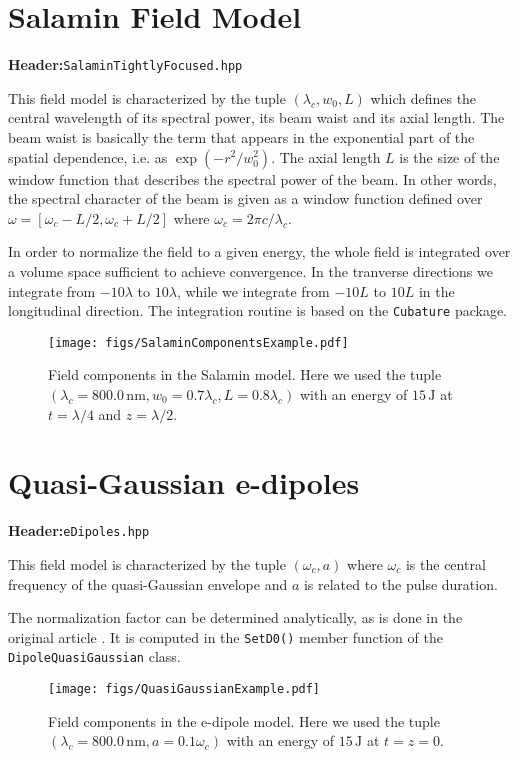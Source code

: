 \documentclass[10pt,letterpaper,extrafontsizes, onecolumn,openright]{memoir}
\begin{document}
\section{Salamin Field Model}
\textbf{Header:}\hfill\texttt{SalaminTightlyFocused.hpp}
\vspace{0.5cm}

This field model is characterized by the tuple $(\lambda_c,w_0,L)$ which
defines the central wavelength of its spectral power, its beam waist and
its axial length. The beam waist is basically the term that appears in the exponential
part of the spatial dependence, i.e. as $\exp(-r^2/w_0^2)$. The axial length $L$
is the size of the window function that describes the spectral power of the beam.
In other words, the spectral character of the beam is given as a window function
defined over $\omega=[\omega_c-L/2,­\omega_c+L/2]$ where $\omega_c=2\pi c/\lambda_c$.

In order to normalize the field to a given energy, the whole field is integrated
over a volume space sufficient to achieve convergence. In the tranverse
directions we integrate from $-10\lambda$ to $10\lambda$, while we integrate
from $-10L$ to $10L$ in the longitudinal direction. The integration routine
is based on the \texttt{Cubature} package.

\begin{figure}
	\centering
	\texttt{[image: figs/SalaminComponentsExample.pdf]}
	\caption{Field components in the Salamin model. Here we used the tuple
	$(\lambda_c=800.0\,\si{\nano\metre},w_0=0.7\lambda_c, L=0.8\lambda_c)$
	with an energy of $15\,\si{\joule}$ at $t=\lambda/4$ and $z=\lambda/2$.}
\end{figure}

\section{Quasi-Gaussian e-dipoles}
\textbf{Header:}\hfill\texttt{eDipoles.hpp}
\vspace{0.5cm}

This field model is characterized by the tuple $(\omega_c,a)$ where $\omega_c$
is the central frequency of the quasi-Gaussian envelope and $a$ is related
to the pulse duration.

The normalization factor can be determined analytically, as is done
in the original article \cite{GON2012}. It is computed in the \texttt{SetD0()}
member function of the \texttt{DipoleQuasiGaussian} class.

\begin{figure}
	\centering
	\texttt{[image: figs/QuasiGaussianExample.pdf]}
	\caption{Field components in the e-dipole model. Here we used the tuple
	$(\lambda_c=800.0\,\si{\nano\metre},a=0.1\omega_c)$
	with an energy of $15\,\si{\joule}$ at $t=z=0$.}
\end{figure}
\end{document}
